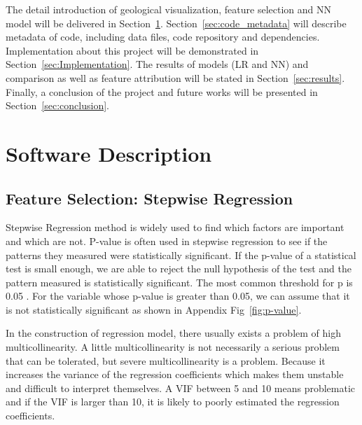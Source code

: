 \documentclass[final-report]{report-template}
\begin{document}
The detail introduction of geological visualization, feature selection and NN model will be delivered in Section~\ref{sec:software_description}. Section~\ref{sec:code_metadata} will describe metadata of code, including data files, code repository and dependencies.
Implementation about this project will be demonstrated in Section~\ref{sec:Implementation}. The results of models (LR and NN) and comparison as well as feature attribution will be stated in Section~\ref{sec:results}.
Finally, a conclusion of the project and future works will be presented in Section~\ref{sec:conclusion}. 




\section{Software Description}
\label{sec:software_description}

\subsection{Feature Selection: Stepwise Regression}
\label{sec:stepwise}
Stepwise Regression method is widely used to find which factors are important and which are not.
P-value is often used in stepwise regression to see if the patterns they measured were statistically significant. If the p-value of a statistical test is small enough, we are able to reject the null hypothesis of the test and the pattern measured is statistically significant.
The most common threshold for p is 0.05 \citep{ioannidis2018proposal}. For the variable whose p-value is greater than 0.05, we can assume that it is not statistically significant as shown in Appendix Fig~\ref{fig:p-value}.

In the construction of regression model, there usually exists a problem of high multicollinearity.
A little multicollinearity is not necessarily a serious problem that can be tolerated, but severe multicollinearity is a problem. Because it increases the variance of the regression coefficients which makes them unstable and difficult to interpret themselves.
A VIF between 5 and 10 means problematic and if the VIF is larger than 10, it is likely to poorly estimated the regression coefficients.
\end{document}
